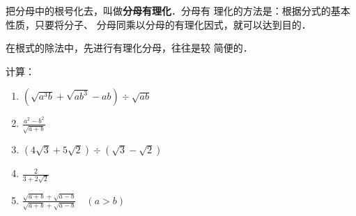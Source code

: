 把分母中的根号化去，叫做\textbf{分母有理化}．分母有
理化的方法是：根据分式的基本性质，只要将分子、
分母同乘以分母的有理化因式，就可以达到目的．

在根式的除法中，先进行有理化分母，往往是较
简便的．

\begin{example}
计算：
\begin{multicols}{2}
    \begin{enumerate}
        \item $\left(\sqrt{a^3b}+\sqrt{ab^3}-ab\right)\div \sqrt{ab}$
        \item $\frac{a^2-b^2}{\sqrt{a+b}}$
        \item $\left(4\sqrt{3}+5\sqrt{2}\right)\div \left(\sqrt{3}-\sqrt{2}\right)$
        \item $\frac{2}{3+2\sqrt{2}}$
        \item $\frac{\sqrt{a+b}+\sqrt{a-b}}{\sqrt{a+b}+\sqrt{a-b}}\quad (a>b)$
    \end{enumerate}   
\end{multicols}
\end{example}

